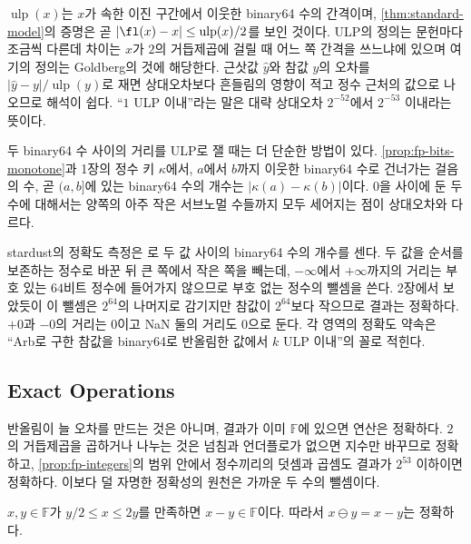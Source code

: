 $\operatorname{ulp}(x)$는 $x$가 속한 이진 구간에서 이웃한 binary64 수의 간격이며, \cref{thm:standard-model}의 증명은 곧 $|\fl(x)-x|\le\operatorname{ulp}(x)/2$를 보인 것이다. ULP의 정의는 문헌마다 조금씩 다른데 차이는 $x$가 $2$의 거듭제곱에 걸릴 때 어느 쪽 간격을 쓰느냐에 있으며 여기의 정의는 Goldberg의 것에 해당한다\cite{goldberg1991,muller2018handbook}. 근삿값 $\hat y$와 참값 $y$의 오차를 $|\hat y-y|/\operatorname{ulp}(y)$로 재면 상대오차보다 흔들림의 영향이 적고 정수 근처의 값으로 나오므로 해석이 쉽다. ``$1$ ULP 이내''라는 말은 대략 상대오차 $2^{-52}$에서 $2^{-53}$ 이내라는 뜻이다.

두 binary64 수 사이의 거리를 ULP로 잴 때는 더 단순한 방법이 있다. \cref{prop:fp-bits-monotone}과 1장의 정수 키 $\kappa$에서, $a$에서 $b$까지 이웃한 binary64 수로 건너가는 걸음의 수, 곧 $(a,b]$에 있는 binary64 수의 개수는 $|\kappa(a)-\kappa(b)|$이다. $0$을 사이에 둔 두 수에 대해서는 양쪽의 아주 작은 서브노멀 수들까지 모두 세어지는 점이 상대오차와 다르다.

\begin{instardust}
stardust의 정확도 측정은 로 두 값 사이의 binary64 수의 개수를 센다. 두 값을 순서를 보존하는 정수로 바꾼 뒤 큰 쪽에서 작은 쪽을 빼는데, $-\infty$에서 $+\infty$까지의 거리는 부호 있는 $64$비트 정수에 들어가지 않으므로 부호 없는 정수의 뺄셈을 쓴다. 2장에서 보았듯이 이 뺄셈은 $2^{64}$의 나머지로 감기지만 참값이 $2^{64}$보다 작으므로 결과는 정확하다. $+0$과 $-0$의 거리는 $0$이고 NaN 둘의 거리도 $0$으로 둔다. 각 영역의 정확도 약속은 ``Arb로 구한 참값을 binary64로 반올림한 값에서 $k$ ULP 이내''의 꼴로 적힌다.
\end{instardust}

\subsection{Exact Operations}

반올림이 늘 오차를 만드는 것은 아니며, 결과가 이미 $\mathbb F$에 있으면 연산은 정확하다. $2$의 거듭제곱을 곱하거나 나누는 것은 넘침과 언더플로가 없으면 지수만 바꾸므로 정확하고, \cref{prop:fp-integers}의 범위 안에서 정수끼리의 덧셈과 곱셈도 결과가 $2^{53}$ 이하이면 정확하다. 이보다 덜 자명한 정확성의 원천은 가까운 두 수의 뺄셈이다.

\begin{lemma}[Sterbenz]
\label{lem:sterbenz}
$x,y\in\mathbb F$가 $y/2\le x\le2y$를 만족하면 $x-y\in\mathbb F$이다. 따라서 $x\ominus y=x-y$는 정확하다.
\end{lemma}

